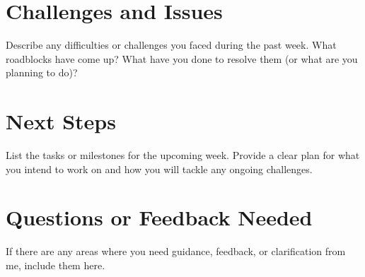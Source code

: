 \documentclass{article}
\begin{document}
    \section*{Challenges and Issues}
    Describe any difficulties or challenges you faced during the past week. What roadblocks have come up? What have you done to resolve them (or what are you planning to do)?

    \section*{Next Steps}
    List the tasks or milestones for the upcoming week. Provide a clear plan for what you intend to work on and how you will tackle any ongoing challenges.

    \section*{Questions or Feedback Needed}
    If there are any areas where you need guidance, feedback, or clarification from me, include them here.

    
    
\end{document}

